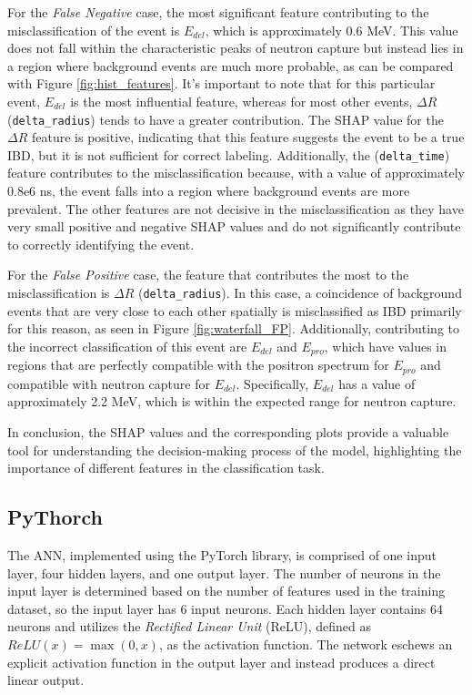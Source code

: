 For the \textit{False Negative} case, the most significant feature contributing to the misclassification of the event is $E_{del}$, which is approximately 0.6 MeV. This value does not fall within the characteristic peaks of neutron capture but instead lies in a region where background events are much more probable, as can be compared with Figure \ref{fig:hist_features}. It's important to note that for this particular event, $E_{del}$ is the most influential feature, whereas for most other events, $\Delta R$ (\texttt{delta\_radius}) tends to have a greater contribution. The SHAP value for the $\Delta R$ feature is positive, indicating that this feature suggests the event to be a true IBD, but it is not sufficient for correct labeling. Additionally, the (\texttt{delta\_time}) feature contributes to the misclassification because, with a value of approximately 0.8e6 ns, the event falls into a region where background events are more prevalent. The other features are not decisive in the misclassification as they have very small positive and negative SHAP values and do not significantly contribute to correctly identifying the event.

For the \textit{False Positive} case, the feature that contributes the most to the misclassification is $\Delta R$ (\texttt{delta\_radius}). In this case, a coincidence of background events that are very close to each other spatially is misclassified as IBD primarily for this reason, as seen in Figure \ref{fig:waterfall_FP}. Additionally, contributing to the incorrect classification of this event are $E_{del}$ and $E_{pro}$, which have values in regions that are perfectly compatible with the positron spectrum for $E_{pro}$ and compatible with neutron capture for $E_{del}$. Specifically, $E_{del}$ has a value of approximately 2.2 MeV, which is within the expected range for neutron capture.


In conclusion, the SHAP values and the corresponding plots provide a valuable tool for understanding the decision-making process of the model, highlighting the importance of different features in the classification task. 


\subsection{PyThorch}
The ANN, implemented using the PyTorch library, is comprised of one input layer, four hidden layers, and one output layer. The number of neurons in the input layer is determined based on the number of features used in the training dataset, so the input layer has 6 input neurons. Each hidden layer contains 64 neurons and utilizes the \textit{Rectified Linear Unit} (ReLU), defined as $ ReLU(x) = \max(0, x) $, as the activation function. The network eschews an explicit activation function in the output layer and instead produces a direct linear output.

